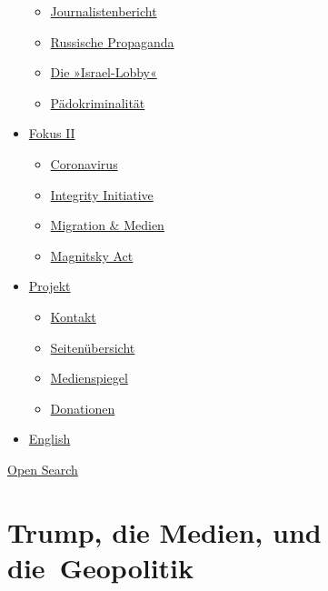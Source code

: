 \begin{itemize}
  \begin{itemize}
  \tightlist
  \item
    \href{https://swprs.org/bericht-eines-journalisten/}{Journalistenbericht}
  \item
    \href{https://swprs.org/russische-propaganda/}{Russische Propaganda}
  \item
    \href{https://swprs.org/die-israel-lobby-fakten-und-mythen/}{Die
    »Israel-Lobby«}
  \item
    \href{https://swprs.org/geopolitik-und-paedokriminalitaet/}{Pädokriminalität}
  \end{itemize}
\item
  \href{https://swprs.org/migration-und-medien/}{Fokus II}

  \begin{itemize}
  \tightlist
  \item
    \href{https://swprs.org/covid-19-hinweis-ii/}{Coronavirus}
  \item
    \href{https://swprs.org/die-integrity-initiative/}{Integrity
    Initiative}
  \item
    \href{https://swprs.org/migration-und-medien/}{Migration \& Medien}
  \item
    \href{https://swprs.org/der-fall-magnitsky/}{Magnitsky Act}
  \end{itemize}
\item
  \href{https://swprs.org/kontakt/}{Projekt}

  \begin{itemize}
  \tightlist
  \item
    \href{https://swprs.org/kontakt/}{Kontakt}
  \item
    \href{https://swprs.org/uebersicht/}{Seitenübersicht}
  \item
    \href{https://swprs.org/medienspiegel/}{Medienspiegel}
  \item
    \href{https://swprs.org/donationen/}{Donationen}
  \end{itemize}
\item
  \href{https://swprs.org/contact/}{English}
\end{itemize}

\protect\hyperlink{}{Open Search}

\hypertarget{trump-die-medien-und-die-geopolitik}{%
\section{Trump, die Medien, und
die~Geopolitik}\label{trump-die-medien-und-die-geopolitik}}

